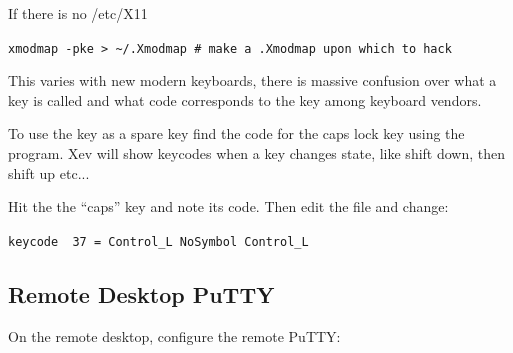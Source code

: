 If there is no /etc/X11


\verb=xmodmap -pke > ~/.Xmodmap # make a .Xmodmap upon which to hack=

This varies with new modern keyboards, there is massive
confusion over what a key is called and what code corresponds to
the key among keyboard vendors. 

To use the  key as a spare  key find the
code for the caps lock key using the  program. Xev will show
keycodes when a key changes state, like shift down, then shift up
etc...  

Hit the the ``caps'' key and note its code. Then edit the 
file and change:

\verb/keycode  37 = Control_L NoSymbol Control_L/



\newpage
\subsection{Remote Desktop PuTTY}

On the remote desktop, configure the remote PuTTY:

